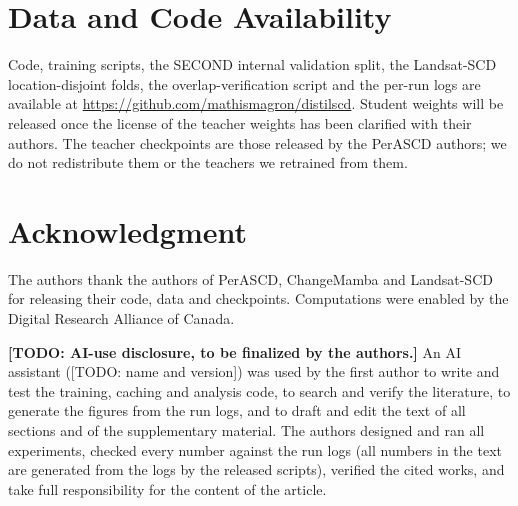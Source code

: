 \documentclass[journal]{IEEEtran}
\begin{document}
\section*{Data and Code Availability}
\label{sec:availability}
Code, training scripts, the SECOND internal validation split, the Landsat-SCD location-disjoint
folds, the overlap-verification script and the per-run logs are available at
\url{https://github.com/mathismagron/distilscd}. Student weights will be released once the license
of the teacher weights has been clarified with their authors. The teacher checkpoints are those released by
the PerASCD authors; we do not redistribute them or the teachers we retrained from them.

\section*{Acknowledgment}
The authors thank the authors of PerASCD, ChangeMamba and Landsat-SCD for releasing their code,
data and checkpoints. Computations were enabled by the Digital Research Alliance of Canada.

\textbf{[TODO: AI-use disclosure, to be finalized by the authors.]} An AI assistant
([TODO: name and version]) was used by the first author to write and test the training, caching
and analysis code, to search and verify the literature, to generate the figures from the run logs,
and to draft and edit the text of all sections and of the supplementary material. The authors
designed and ran all experiments, checked every number against the run logs (all numbers in the
text are generated from the logs by the released scripts), verified the cited works, and take full
responsibility for the content of the article.



\end{document}

